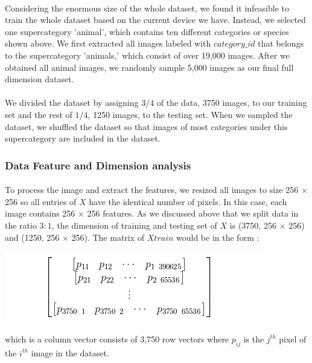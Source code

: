 \documentclass{article}
\begin{document}
\paragraph{}
Considering the enormous size of the whole dataset, we found it infeasible to train the whole dataset based on the current device we have. Instead, we selected one supercategory 'animal', which contains ten different categories or species shown above. We first extracted all images labeled with $category\_ id$ that belongs to the supercategory 'animals,' which consist of over 19,000 images. After we obtained all animal images, we randomly sample 5,000 images as our final full dimension dataset.
\paragraph{}
We divided the dataset by assigning $3 \slash 4$ of the data, 3750 images, to our training set and the rest of $1\slash 4$, 1250 images, to the testing set. When we sampled the dataset, we shuffled the dataset so that images of most categories under this supercategory are included in the dataset.
 
\subsubsection{Data Feature and Dimension analysis}
\paragraph{}
To process the image and extract the features, we resized all images to size 256 $\times$ 256 so all entries of $X$ have the identical number of pixels. In this case, each image contains 256 $\times$ 256 features. As we discussed above that we split data in the ratio $3:1$, the dimension of training and testing set of $X$ is (3750, 256 $\times$ 256) and (1250, 256 $\times$ 256). The matrix of $X{train}$  would be in the form :
\begin{center}
\includegraphics[scale=0.6]{6}
\end{center}
which is a column vector consists of 3,750 row vectors  where $p_{ij}$ is the $j^{th}$ pixel of the $i^{th}$ image in the dataset.
\end{document}
